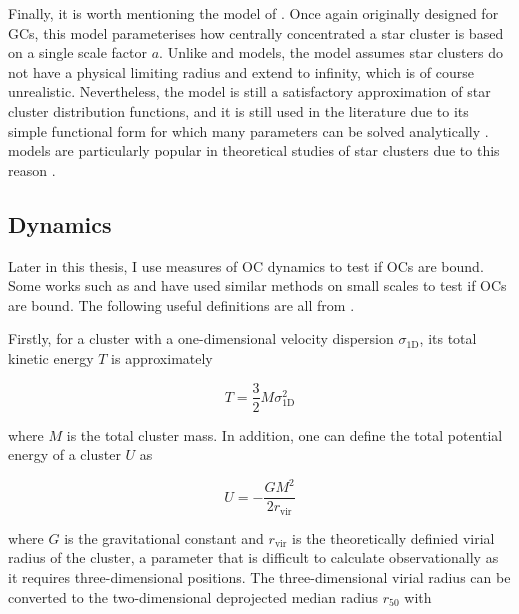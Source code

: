 Finally, it is worth mentioning the model of \cite{plummer_problem_1911}. Once again originally designed for GCs, this model parameterises how centrally concentrated a star cluster is based on a single scale factor $a$. Unlike \cite{king_structure_star_1962} and \cite{king_structure_1966} models, the \cite{plummer_problem_1911} model assumes star clusters do not have a physical limiting radius and extend to infinity, which is of course unrealistic. Nevertheless, the \cite{plummer_problem_1911} model is still a satisfactory approximation of star cluster distribution functions, and it is still used in the literature due to its simple functional form for which many parameters can be solved analytically \citep{dejonghe_completely_analytical_1987}. \cite{plummer_problem_1911} models are particularly popular in theoretical studies of star clusters due to this reason \citep{portegies_zwart_young_2010}.


\subsection{Dynamics}
\label{sec:intro:theory:dynamics}

Later in this thesis, I use measures of OC dynamics to test if OCs are bound. Some works such as \cite{bravi_gaia-eso_2018} and \cite{pang_3d_2021} have used similar methods on small scales to test if OCs are bound. The following useful definitions are all from \cite{portegies_zwart_young_2010}.

Firstly, for a cluster with a one-dimensional velocity dispersion $\sigma_\text{1D}$, its total kinetic energy $T$ is approximately

\begin{equation}
	T = \frac{3}{2} M \sigma_\text{1D}^2
\end{equation}

\noindent
where $M$ is the total cluster mass. In addition, one can define the total potential energy of a cluster $U$ as 

\begin{equation}
	U = - \frac{GM^2}{2r_\text{vir}}
\end{equation}

\noindent
where $G$ is the gravitational constant and $r_\text{vir}$ is the theoretically definied virial radius of the cluster, a parameter that is difficult to calculate observationally as it requires three-dimensional positions. The three-dimensional virial radius can be converted to the two-dimensional deprojected median radius $r_{50}$ with

